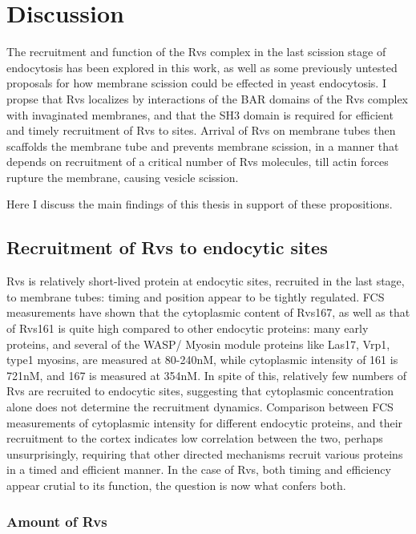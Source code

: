 
\chapter{Discussion}    
\label{Ch:discussion}
The recruitment and function of the Rvs complex in the last scission stage of endocytosis has been explored in this work, as well as some previously untested proposals for how membrane scission could be effected in yeast endocytosis. 
I propse that Rvs localizes by interactions of the BAR domains of the Rvs complex with invaginated membranes, and that the SH3 domain is required for efficient and timely recruitment of Rvs to sites. Arrival of Rvs on membrane tubes then scaffolds the membrane tube and prevents membrane scission, in a manner that depends on recruitment of a critical number of Rvs molecules, till actin forces rupture the membrane, causing vesicle scission. 

Here I discuss the main findings of this thesis in support of these propositions.

\section{Recruitment of Rvs to endocytic sites}
Rvs is relatively short-lived protein at endocytic sites, recruited in the last stage, to membrane tubes: timing and position appear to be tightly regulated. FCS measurements have shown that the cytoplasmic content of Rvs167, as well as that of Rvs161 is quite high compared to other endocytic proteins: many early proteins, and several of the WASP/ Myosin module proteins like Las17, Vrp1, type1 myosins, are measured at 80-240nM, while cytoplasmic intensity of 161 is 721nM, and 167 is measured at 354nM. In spite of this, relatively few numbers of Rvs are recruited to endocytic sites, suggesting that cytoplasmic concentration alone does not determine the recruitment dynamics. Comparison between FCS measurements of cytoplasmic intensity for different endocytic proteins, and their recruitment to the cortex indicates low correlation between the two, perhaps unsurprisingly, requiring that other directed mechanisms recruit various proteins in a timed and efficient manner. In the case of Rvs, both timing and efficiency appear crutial to its function, the question is now what confers both.  

\subsection{Amount of Rvs}


